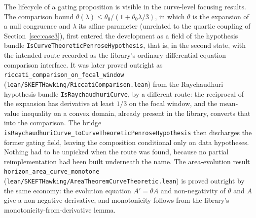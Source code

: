 \documentclass[11pt]{article}
\begin{document}
The lifecycle of a gating proposition is visible in the curve-level
focusing results. The comparison bound
$\theta(\lambda) \le \theta_0 / (1 + \theta_0\lambda/3)$, in which
$\theta$ is the expansion of a null congruence and $\lambda$ its affine
parameter (unrelated to the quartic coupling of
Section~\ref{sec:case3}), first entered
the development as a field of the hypothesis bundle
\texttt{IsCurveTheoreticPenroseHypothesis}, that is, in the second
state, with the intended route recorded as the library's ordinary
differential equation comparison interface. It was later proved
outright as \texttt{riccati\_comparison\_on\_focal\_window}
(\texttt{lean/SKEFTHawking/RiccatiComparison.lean}) from the
Raychaudhuri hypothesis bundle \texttt{IsRaychaudhuriCurve}, by a
different route: the reciprocal of the expansion has derivative at
least $1/3$ on the focal window, and the mean-value inequality on a
convex domain, already present in the library, converts that into the
comparison. The bridge
\texttt{isRaychaudhuriCurve\_toCurveTheoreticPenroseHypothesis} then
discharges the former gating field, leaving the composition
conditional only on data hypotheses. Nothing had to be unpicked when
the route was found, because no partial reimplementation had been
built underneath the name. The area-evolution result
\texttt{horizon\_area\_curve\_monotone}
(\texttt{lean/SKEFTHawking/AreaTheoremCurveTheoretic.lean}) is proved
outright by the same economy: the evolution equation
$A' = \theta A$ and non-negativity of $\theta$ and $A$ give a
non-negative derivative, and monotonicity follows from the library's
monotonicity-from-derivative lemma.
\end{document}
